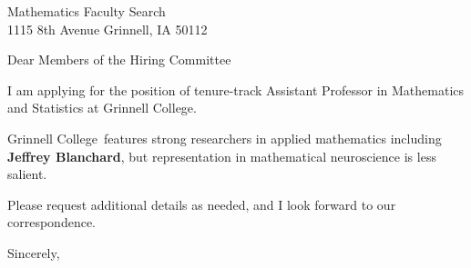 




	
	
	\def\School{Grinnell College}
	
	\begin{letter}
		{Mathematics Faculty Search\\
		1115 8th Avenue
		Grinnell, IA 50112
		}
		
		\opening{Dear Members of the Hiring Committee}
		
		
		I am applying for the position of tenure-track Assistant Professor in Mathematics and Statistics at \School. 
		
		\School~features strong researchers in applied mathematics including \textbf{Jeffrey Blanchard}, but representation in mathematical neuroscience is less salient.  
		
		
		
		
		
		Please request additional details as needed, and I look forward to our correspondence.
		
		\closing{Sincerely,}
	\end{letter}
